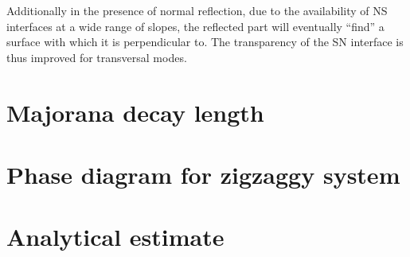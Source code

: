		Additionally in the presence of normal reflection, due to the availability of NS interfaces at a wide range of slopes, the reflected part will eventually ``find'' a surface with which it is perpendicular to. The transparency of the SN interface is thus improved for transversal modes.


	\section{Majorana decay length}
	\section{Phase diagram for zigzaggy system}
	\section{Analytical estimate}
